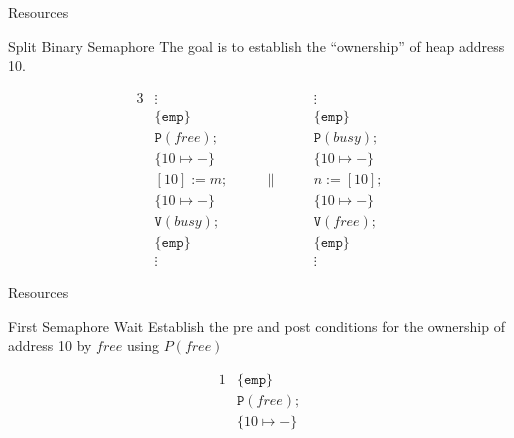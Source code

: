 \documentclass{beamer}
\begin{document}
\begin{frame}{Resources}
  \begin{block}{Split Binary Semaphore}
    The goal is to establish the ``ownership'' of heap address 10.
  \end{block}

  \begin{example}
    \begin{alignat*}{3}
      & \vdots            && \vdots \\
      & \{\mathtt{emp}\}  && \{\mathtt{emp}\}  \\
      & \mathtt{P}(free); && \mathtt{P}(busy); \\
      & \{10 \mapsto -\}  && \{10 \mapsto -\}  \\
      & [10] := m; & \qquad \| \qquad & n := [10]; \\
      & \{10 \mapsto -\}  && \{10 \mapsto -\}  \\
      & \mathtt{V}(busy); && \mathtt{V}(free); \\
      & \{\mathtt{emp}\}  && \{\mathtt{emp}\}  \\
      & \vdots            && \vdots
    \end{alignat*}
  \end{example}
\end{frame}

\begin{frame}{Resources}
  \begin{block}{First Semaphore Wait}
    Establish the pre and post conditions for the ownership of address 10 by $free$ using $P(free)$
  \end{block}

  \begin{example}
    \begin{alignat*}{1}
      & \{\mathtt{emp}\} \\
      & \mathtt{P}(free); \\
      & \{10 \mapsto -\} \\
    \end{alignat*}
  \end{example}
\end{frame}
\end{document}
